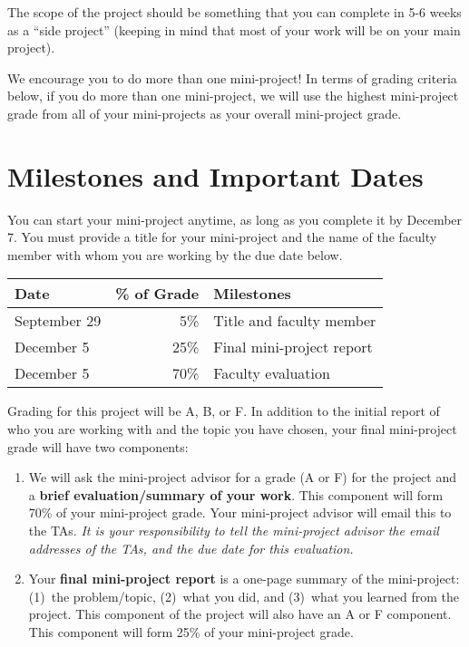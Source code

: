 \documentclass[11pt]{article}
\begin{document}
The scope of the project should be something that you can complete in
5-6 weeks as a ``side project'' (keeping in mind that most of your work
will be on your main project).

We encourage you to do more than one mini-project!  In terms of grading
criteria below, if you do more than one mini-project, we will use the
highest mini-project grade from all of your mini-projects as your
overall mini-project grade.

\section{Milestones and Important Dates}

You can start your mini-project anytime, as long as you complete it by
December 7.   You must provide a title for your mini-project and the
name of the faculty member with whom you are working by the due date
below.

\begin{center}
\begin{tabular}{lrp{3.5in}}
{\bf Date} & {\bf \% of Grade} & {\bf Milestones} \\ \hline
September 29 & 5\% & Title and faculty member \\
December 5 & 25\% & Final mini-project report \\
December 5 & 70\% & Faculty evaluation
\end{tabular}
\end{center}

Grading for this project will be A, B, or F.  In addition to the initial
report of who you are working with and the topic you have chosen, your
final mini-project grade will have two components:

\begin{enumerate}
\itemsep=-1pt
\item We will ask the mini-project advisor for a grade (A or F) for the
  project and a {\bf brief evaluation/summary of your work}. This
  component will form 70\% of your mini-project grade.  Your
  mini-project advisor will email this to the TAs. {\em It is your
  responsibility to tell the mini-project advisor the email addresses of
  the TAs, and the due date for this evaluation.}
%
\item Your {\bf final mini-project report} is a one-page summary of the
  mini-project: (1)~the problem/topic, (2)~what you did, and (3)~what
  you learned from the project.  This component of the project will also
  have an A or F component. This component will form 25\% of your
  mini-project grade.
\end{enumerate}
\end{document}
